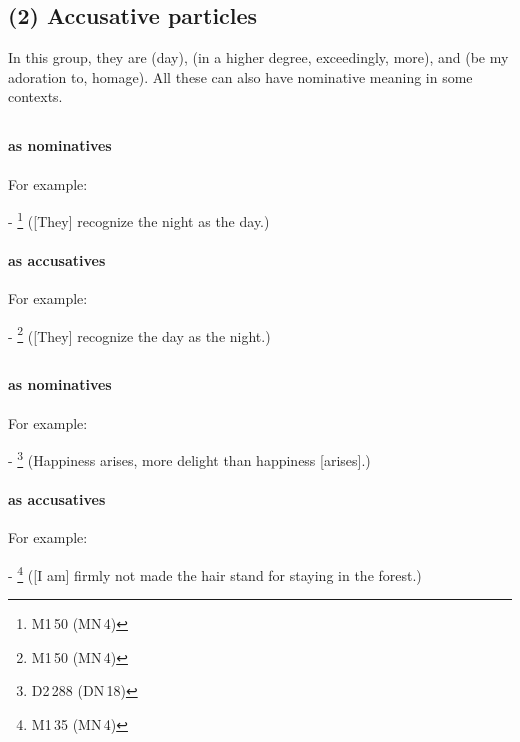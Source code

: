 \subsection*{(2) Accusative particles}
In this group, they are  (day),  (in a higher degree, exceedingly, more), and  (be my adoration to, homage). All these can also have nominative meaning in some contexts.

\subsection*{}\label{nip:divaa}
\paragraph*{ as nominatives} For example:\par
- \footnote{M1\,50 (MN\,4)} ([They] recognize the night as the day.) \par
\paragraph*{ as accusatives} For example:\par
- \footnote{M1\,50 (MN\,4)} ([They] recognize the day as the night.) \par

\subsection*{}\label{nip:bhiyyo}
\paragraph*{ as nominatives} For example:\par
- \footnote{D2\,288 (DN\,18)} (Happiness arises, more delight than happiness [arises].) \par
\paragraph*{ as accusatives} For example:\par
- \footnote{M1\,35 (MN\,4)} ([I am] firmly not made the hair stand for staying in the forest.) \par

